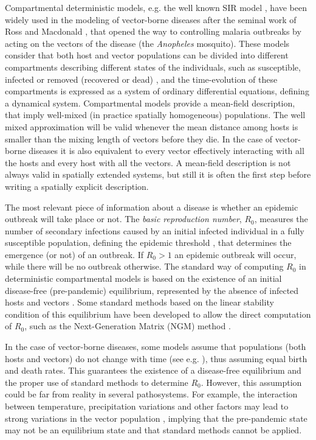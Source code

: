 Compartmental deterministic models, e.g. the well known SIR model
\cite{McKendrick}, have been widely used in the modeling of vector-borne
diseases after the seminal work of Ross and Macdonald \cite{Macdonald1957},
that opened the way to controlling malaria outbreaks by acting on the vectors
of the disease (the \textit{Anopheles} mosquito). These models consider that
both host and vector populations can be divided into different compartments
describing different states of the individuals, such as susceptible, infected
or removed (recovered or dead) \cite{Brauer2008}, and the time-evolution of
these compartments is expressed as a system of ordinary differential equations,
defining a dynamical system. Compartmental models provide a mean-field
description, that imply well-mixed (in practice spatially homogeneous)
populations. The well mixed approximation will be valid whenever the mean
distance among hosts is smaller than the mixing length of vectors before they
die. In the case of vector-borne diseases it is also equivalent to every vector
effectively interacting with all the hosts and every host with all the vectors.
A mean-field description is not always valid in spatially extended systems, but
still it is often the first step before writing a spatially explicit
description.

The most relevant piece of information about a disease is whether an
epidemic outbreak will take place or not. The \textit{basic reproduction
    number}, $R_0$, measures the number of secondary infections caused by an
initial infected individual in a fully susceptible population, defining the
epidemic threshold \cite{Anderson1991, VandenDriessche2017}, that determines
the emergence (or not) of an outbreak. If $R_0>1$ an epidemic outbreak will
occur, while there will be no outbreak otherwise. The standard way of computing
$R_0$ in deterministic compartmental models is based on the existence of an
initial disease-free (pre-pandemic) equilibrium, represented by the absence of
infected hosts and vectors \cite{Lauko2006, Kamgang2008}. Some standard
methods based on the linear stability condition of this equilibrium have been
developed to allow the direct computation of $R_0$, such as the Next-Generation
Matrix (NGM) method \cite{Diekmann2010}.

In the case of vector-borne diseases, some models assume that populations
(both hosts and vectors) do not change with time (see e.g.
\cite{Macdonald1957, Brauer2016, VandenBosch2017}), thus assuming equal birth
and death rates. This guarantees the existence of a disease-free equilibrium
and the proper use of standard methods to determine $R_0$. However, this
assumption could be far from reality in several pathosystems. For example, the
interaction between temperature, precipitation variations and other factors may
lead to strong variations in the vector population
\cite{garms1979studies,Rocklov2020}, implying that the pre-pandemic state may
not be an equilibrium state and that standard methods cannot be applied.

